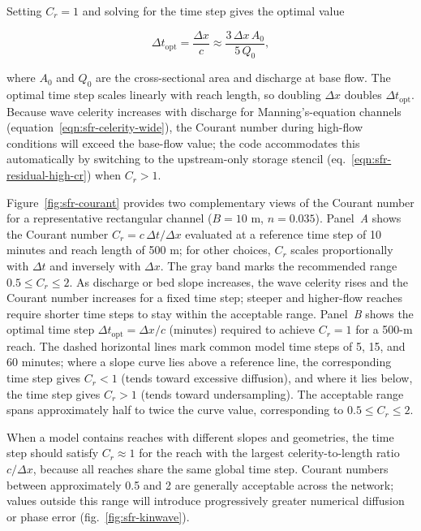 \noindent Setting $C_r = 1$ and solving for the time step gives the optimal value

\begin{equation}
	\label{eqn:sfr-dt-opt}
	\Delta t_\mathrm{opt} = \frac{\Delta x}{c} \approx \frac{3\,\Delta x\,A_0}{5\,Q_0} ,
\end{equation}

\noindent where $A_0$ and $Q_0$ are the cross-sectional area and discharge at base flow. The optimal time step scales linearly with reach length, so doubling $\Delta x$ doubles $\Delta t_\mathrm{opt}$. Because wave celerity increases with discharge for Manning's-equation channels (equation~\ref{eqn:sfr-celerity-wide}), the Courant number during high-flow conditions will exceed the base-flow value; the code accommodates this automatically by switching to the upstream-only storage stencil (eq.~\ref{eqn:sfr-residual-high-cr}) when $C_r > 1$.

Figure~\ref{fig:sfr-courant} provides two complementary views of the Courant number for a representative rectangular channel ($B = 10$ m, $n = 0.035$). Panel~\textit{A} shows the Courant number $C_r = c\,\Delta t / \Delta x$ evaluated at a reference time step of 10 minutes and reach length of 500 m; for other choices, $C_r$ scales proportionally with $\Delta t$ and inversely with $\Delta x$. The gray band marks the recommended range $0.5 \le C_r \le 2$. As discharge or bed slope increases, the wave celerity rises and the Courant number increases for a fixed time step; steeper and higher-flow reaches require shorter time steps to stay within the acceptable range. Panel~\textit{B} shows the optimal time step $\Delta t_\mathrm{opt} = \Delta x / c$ (minutes) required to achieve $C_r = 1$ for a 500-m reach. The dashed horizontal lines mark common model time steps of 5, 15, and 60 minutes; where a slope curve lies above a reference line, the corresponding time step gives $C_r < 1$ (tends toward excessive diffusion), and where it lies below, the time step gives $C_r > 1$ (tends toward undersampling). The acceptable range spans approximately half to twice the curve value, corresponding to $0.5 \le C_r \le 2$.

When a model contains reaches with different slopes and geometries, the time step should satisfy $C_r \approx 1$ for the reach with the largest celerity-to-length ratio $c / \Delta x$, because all reaches share the same global time step. Courant numbers between approximately 0.5 and 2 are generally acceptable across the network; values outside this range will introduce progressively greater numerical diffusion or phase error (fig.~\ref{fig:sfr-kinwave}).

